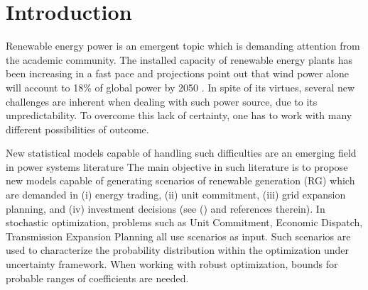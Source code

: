 \section{Introduction}



Renewable energy power is an emergent topic which is demanding attention from the academic community. %
The installed capacity of renewable energy plants has been increasing in a fast pace and projections point out that wind power alone will account to 18\% of global power by 2050  \cite{IntEnerAgency}.
In spite of its virtues, several new challenges are inherent when dealing with such power source, due to its unpredictability. To overcome this lack of certainty, one has to work with many different possibilities of outcome.

New statistical models capable of handling such difficulties are an emerging field in power systems literature \cite{zhang_review_2014, bessa2012time, gallego2016line,moller_time-adaptive_2008,nielsen2006,bremnes_probabilistic_2004,wan_direct_2017} 
The main objective in such literature is to propose new models capable of generating scenarios of renewable generation (RG) which are demanded in (i) energy trading, (ii) unit commitment, (iii) grid expansion planning, and (iv) investment decisions (see (\cite{moreiraStreet,jabr2013robust,zhaoguan,Aderson2017}) and references therein). 
In stochastic optimization, problems such as Unit Commitment, Economic Dispatch, Transmission Expansion Planning all use scenarios as input. 
Such scenarios are used to characterize the probability distribution within the optimization under uncertainty framework.
When working with robust optimization, bounds for probable ranges of coefficients are needed.


